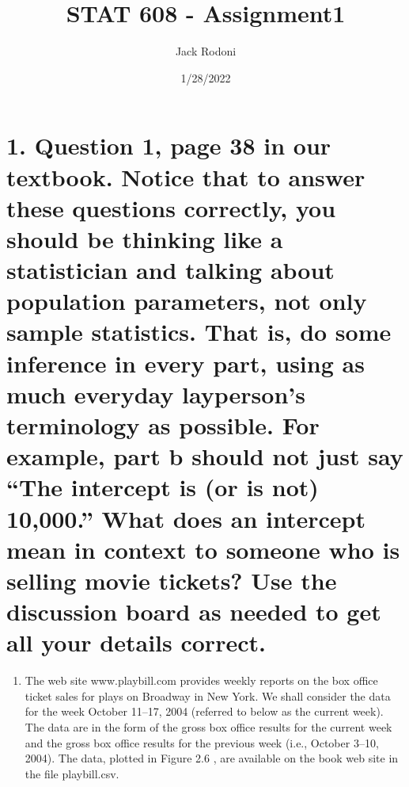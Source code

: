 \documentclass[
]{article}
\title{STAT 608 - Assignment1}
\author{Jack Rodoni}
\date{1/28/2022}
\providecommand{\tightlist}{%
  \setlength{\itemsep}{0pt}\setlength{\parskip}{0pt}}
\begin{document}
\maketitle

\hypertarget{question-1-page-38-in-our-textbook.-notice-that-to-answer-these-questions-correctly-you-should-be-thinking-like-a-statistician-and-talking-about-population-parameters-not-only-sample-statistics.-that-is-do-some-inference-in-every-part-using-as-much-everyday-laypersons-terminology-as-possible.-for-example-part-b-should-not-just-say-the-intercept-is-or-is-not-10000.-what-does-an-intercept-mean-in-context-to-someone-who-is-selling-movie-tickets-use-the-discussion-board-as-needed-to-get-all-your-details-correct.}{%
\section{1. Question 1, page 38 in our textbook. Notice that to answer
these questions correctly, you should be thinking like a statistician
and talking about population parameters, not only sample statistics.
That is, do some inference in every part, using as much everyday
layperson's terminology as possible. For example, part b should not just
say ``The intercept is (or is not) 10,000.'' What does an intercept mean
in context to someone who is selling movie tickets? Use the discussion
board as needed to get all your details
correct.}\label{question-1-page-38-in-our-textbook.-notice-that-to-answer-these-questions-correctly-you-should-be-thinking-like-a-statistician-and-talking-about-population-parameters-not-only-sample-statistics.-that-is-do-some-inference-in-every-part-using-as-much-everyday-laypersons-terminology-as-possible.-for-example-part-b-should-not-just-say-the-intercept-is-or-is-not-10000.-what-does-an-intercept-mean-in-context-to-someone-who-is-selling-movie-tickets-use-the-discussion-board-as-needed-to-get-all-your-details-correct.}}

\begin{enumerate}
\def\labelenumi{\arabic{enumi}.}
\tightlist
\item
  The web site www.playbill.com provides weekly reports on the box
  office ticket sales for plays on Broadway in New York. We shall
  consider the data for the week October 11--17, 2004 (referred to below
  as the current week). The data are in the form of the gross box office
  results for the current week and the gross box office results for the
  previous week (i.e., October 3--10, 2004). The data, plotted in Figure
  2.6 , are available on the book web site in the file playbill.csv.
\end{enumerate}
\end{document}
